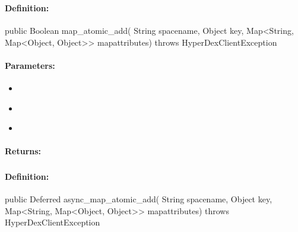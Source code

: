 \pagebreak
\subsubsection{}
\label{api:java:map_atomic_add}


\paragraph{Definition:}
\begin{javacode}
public Boolean map_atomic_add(
        String spacename,
        Object key,
        Map<String, Map<Object, Object>> mapattributes) throws HyperDexClientException
\end{javacode}

\paragraph{Parameters:}
\begin{itemize}[noitemsep]
\item {}\\

\item {}\\

\item {}\\

\end{itemize}

\paragraph{Returns:}


\pagebreak
\subsubsection{}
\label{api:java:async_map_atomic_add}


\paragraph{Definition:}
\begin{javacode}
public Deferred async_map_atomic_add(
        String spacename,
        Object key,
        Map<String, Map<Object, Object>> mapattributes) throws HyperDexClientException
\end{javacode}

